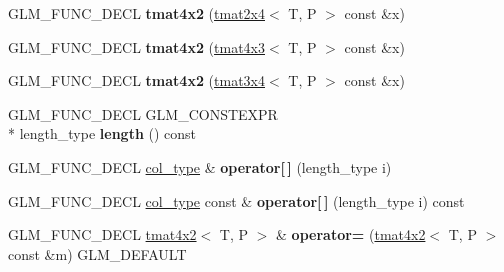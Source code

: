 \begin{DoxyCompactItemize}
\item 
\hypertarget{structglm_1_1tmat4x2_ad48b340a40204cd9b05cf0b7233cccb4}{G\-L\-M\-\_\-\-F\-U\-N\-C\-\_\-\-D\-E\-C\-L {\bfseries tmat4x2} (\hyperlink{structglm_1_1tmat2x4}{tmat2x4}$<$ T, P $>$ const \&x)}\label{structglm_1_1tmat4x2_ad48b340a40204cd9b05cf0b7233cccb4}

\item 
\hypertarget{structglm_1_1tmat4x2_abff28f46da0c6abed7b296042b5a55c3}{G\-L\-M\-\_\-\-F\-U\-N\-C\-\_\-\-D\-E\-C\-L {\bfseries tmat4x2} (\hyperlink{structglm_1_1tmat4x3}{tmat4x3}$<$ T, P $>$ const \&x)}\label{structglm_1_1tmat4x2_abff28f46da0c6abed7b296042b5a55c3}

\item 
\hypertarget{structglm_1_1tmat4x2_a5cf8d107788e7d1e366a6e4abdad0612}{G\-L\-M\-\_\-\-F\-U\-N\-C\-\_\-\-D\-E\-C\-L {\bfseries tmat4x2} (\hyperlink{structglm_1_1tmat3x4}{tmat3x4}$<$ T, P $>$ const \&x)}\label{structglm_1_1tmat4x2_a5cf8d107788e7d1e366a6e4abdad0612}

\item 
\hypertarget{structglm_1_1tmat4x2_a55c9d8785d1c22ca1893c962876f40c3}{G\-L\-M\-\_\-\-F\-U\-N\-C\-\_\-\-D\-E\-C\-L G\-L\-M\-\_\-\-C\-O\-N\-S\-T\-E\-X\-P\-R \\*
length\-\_\-type {\bfseries length} () const }\label{structglm_1_1tmat4x2_a55c9d8785d1c22ca1893c962876f40c3}

\item 
\hypertarget{structglm_1_1tmat4x2_ac3af29ca90810fd2da26fec983a46821}{G\-L\-M\-\_\-\-F\-U\-N\-C\-\_\-\-D\-E\-C\-L \hyperlink{structglm_1_1tvec2}{col\-\_\-type} \& {\bfseries operator\mbox{[}$\,$\mbox{]}} (length\-\_\-type i)}\label{structglm_1_1tmat4x2_ac3af29ca90810fd2da26fec983a46821}

\item 
\hypertarget{structglm_1_1tmat4x2_a5eda80996f1edab70245656b859168d4}{G\-L\-M\-\_\-\-F\-U\-N\-C\-\_\-\-D\-E\-C\-L \hyperlink{structglm_1_1tvec2}{col\-\_\-type} const \& {\bfseries operator\mbox{[}$\,$\mbox{]}} (length\-\_\-type i) const }\label{structglm_1_1tmat4x2_a5eda80996f1edab70245656b859168d4}

\item 
\hypertarget{structglm_1_1tmat4x2_a46c78cffbef2b6300349830a76cb6372}{G\-L\-M\-\_\-\-F\-U\-N\-C\-\_\-\-D\-E\-C\-L \hyperlink{structglm_1_1tmat4x2}{tmat4x2}$<$ T, P $>$ \& {\bfseries operator=} (\hyperlink{structglm_1_1tmat4x2}{tmat4x2}$<$ T, P $>$ const \&m) G\-L\-M\-\_\-\-D\-E\-F\-A\-U\-L\-T}\label{structglm_1_1tmat4x2_a46c78cffbef2b6300349830a76cb6372}


\end{DoxyCompactItemize}
